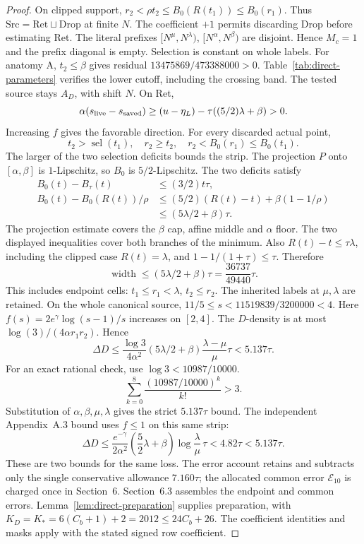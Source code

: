 \begin{proof}
On clipped support,
$r_2<\rho t_2\le B_0(R(t_1))\le B_0(r_1)$.
Thus $\mathrm{Src}=\mathrm{Ret}\sqcup\mathrm{Drop}$ at finite $N$.
The coefficient $+1$ permits discarding Drop before estimating Ret.
The literal prefixes $[N^\mu,N^\lambda)$, $[N^\alpha,N^\beta)$ are disjoint.
Hence $M_c=1$ and the prefix diagonal is empty.
Selection is constant on whole labels.
For anatomy A, $t_2\le\beta$ gives residual $13475869/473388000>0$.
Table~\ref{tab:direct-parameters} verifies the lower cutoff, including the crossing band.
The tested source stays $A_D$, with shift $N$.
On Ret,
\[
 \alpha(s_{\rm live}-s_{\rm saved})\ge
 (u-\eta_L)-\tau((5/2)\lambda+\beta)>0.
\]
Increasing $f$ gives the favorable direction.
For every discarded actual point,
\[
 t_2>\operatorname{sel}(t_1),\quad r_2\ge t_2,\quad
 r_2<B_0(r_1)\le B_0(t_1).
\]
The larger of the two selection deficits bounds the strip.
The projection $P$ onto $[\alpha,\beta]$ is $1$-Lipschitz, so $B_0$ is $5/2$-Lipschitz.
The two deficits satisfy
\[
\begin{aligned}
 B_0(t)-B_\tau(t)&\le(3/2)t\tau,\\
 B_0(t)-B_0(R(t))/\rho
 &\le(5/2)(R(t)-t)+\beta(1-1/\rho)\\
 &\le(5\lambda/2+\beta)\tau.
\end{aligned}
\]
The projection estimate covers the $\beta$ cap, affine middle and $\alpha$ floor.
The two displayed inequalities cover both branches of the minimum.
Also $R(t)-t\le\tau\lambda$, including the clipped case $R(t)=\lambda$,
and $1-1/(1+\tau)\le\tau$.
Therefore
\[
 \operatorname{width}\le(5\lambda/2+\beta)\tau=\frac{36737}{49440}\tau.
\]
This includes endpoint cells: $t_1\le r_1<\lambda$, $t_2\le r_2$.
The inherited labels at $\mu,\lambda$ are retained.
On the whole canonical source, $11/5\le s<11519839/3200000<4$.
Here $f(s)=2e^\gamma\log(s-1)/s$ increases on $[2,4]$.
The $D$-density is at most $\log(3)/(4\alpha r_1r_2)$.
Hence
\[
 \Delta D\le\frac{\log3}{4\alpha^2}(5\lambda/2+\beta)
                    \frac{\lambda-\mu}{\mu}\tau<5.137\tau.
\]
For an exact rational check, use $\log3<10987/10000$.
\[
\sum_{k=0}^{8}\frac{(10987/10000)^k}{k!}>3.
\]
Substitution of $\alpha,\beta,\mu,\lambda$ gives the strict $5.137\tau$ bound.
The independent Appendix~A.3 bound uses $f\le1$ on this same strip:
\[
 \Delta D\le\frac{e^{-\gamma}}{2\alpha^2}
 \left(\frac52\lambda+\beta\right)
 \log\frac{\lambda}{\mu}\,\tau
 <4.82\tau<5.137\tau.
\]
These are two bounds for the same loss. The error account retains and subtracts
only the single conservative allowance $7.160\tau$; the allocated common
error $\mathcal E_{10}$ is charged once in Section~6.
Section~6.3 assembles the endpoint and common errors.
Lemma~\ref{lem:direct-preparation} supplies preparation, with
$K_D=K_*=6(C_b+1)+2=2012\le24C_b+26$.
The coefficient identities and masks apply with the stated signed row coefficient.
\end{proof}
